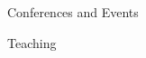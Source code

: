 \documentclass[12pt,2up]{article}
\begin{document}
\begin{cv}{}
\begin{cvlist}{Conferences and Events}


%       



  \end{cvlist}

\begin{cvlist}{Teaching}


\end{cvlist}
\end{cv}
\end{document}
